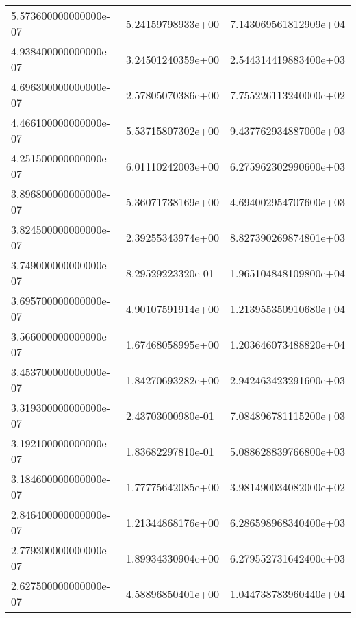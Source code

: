 \begin{center}
{\begin{xtabular}{|l|l|l|}
5.573600000000000e-07 & 5.24159798933e+00 & 7.143069561812909e+04 \\ 
4.938400000000000e-07 & 3.24501240359e+00 & 2.544314419883400e+03 \\ 
4.696300000000000e-07 & 2.57805070386e+00 & 7.755226113240000e+02 \\ 
4.466100000000000e-07 & 5.53715807302e+00 & 9.437762934887000e+03 \\ 
4.251500000000000e-07 & 6.01110242003e+00 & 6.275962302990600e+03 \\ 
3.896800000000000e-07 & 5.36071738169e+00 & 4.694002954707600e+03 \\ 
3.824500000000000e-07 & 2.39255343974e+00 & 8.827390269874801e+03 \\ 
3.749000000000000e-07 & 8.29529223320e-01 & 1.965104848109800e+04 \\ 
3.695700000000000e-07 & 4.90107591914e+00 & 1.213955350910680e+04 \\ 
3.566000000000000e-07 & 1.67468058995e+00 & 1.203646073488820e+04 \\ 
3.453700000000000e-07 & 1.84270693282e+00 & 2.942463423291600e+03 \\ 
3.319300000000000e-07 & 2.43703000980e-01 & 7.084896781115200e+03 \\ 
3.192100000000000e-07 & 1.83682297810e-01 & 5.088628839766800e+03 \\ 
3.184600000000000e-07 & 1.77775642085e+00 & 3.981490034082000e+02 \\ 
2.846400000000000e-07 & 1.21344868176e+00 & 6.286598968340400e+03 \\ 
2.779300000000000e-07 & 1.89934330904e+00 & 6.279552731642400e+03 \\ 
2.627500000000000e-07 & 4.58896850401e+00 & 1.044738783960440e+04 \\
\end{xtabular}}
\end{center}
 \label{tab:R2}
%
%
\tablelasttail{\hline \hline}
